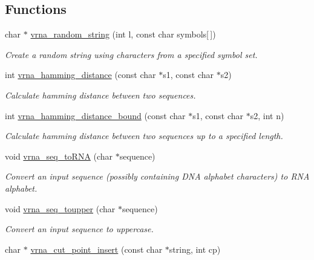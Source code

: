 \subsection*{Functions}
\begin{DoxyCompactItemize}
\item 
char $\ast$ \hyperlink{group__string__utils_ga4eeb3750dcf860b9f3158249f95dbd7f}{vrna\+\_\+random\+\_\+string} (int l, const char symbols\mbox{[}$\,$\mbox{]})
\begin{DoxyCompactList}\small\item\em Create a random string using characters from a specified symbol set. \end{DoxyCompactList}\item 
int \hyperlink{group__string__utils_ga301798b43b6f66687985c725efd14f32}{vrna\+\_\+hamming\+\_\+distance} (const char $\ast$s1, const char $\ast$s2)
\begin{DoxyCompactList}\small\item\em Calculate hamming distance between two sequences. \end{DoxyCompactList}\item 
int \hyperlink{group__string__utils_ga5d1c2271e79d9bcb52d4e68360763fb9}{vrna\+\_\+hamming\+\_\+distance\+\_\+bound} (const char $\ast$s1, const char $\ast$s2, int n)
\begin{DoxyCompactList}\small\item\em Calculate hamming distance between two sequences up to a specified length. \end{DoxyCompactList}\item 
void \hyperlink{group__string__utils_gacfed92cba77064f6c743f9118d079bfc}{vrna\+\_\+seq\+\_\+to\+R\+NA} (char $\ast$sequence)
\begin{DoxyCompactList}\small\item\em Convert an input sequence (possibly containing D\+NA alphabet characters) to R\+NA alphabet. \end{DoxyCompactList}\item 
void \hyperlink{group__string__utils_ga4f44dca03c9d708d68e64c0610bb9091}{vrna\+\_\+seq\+\_\+toupper} (char $\ast$sequence)
\begin{DoxyCompactList}\small\item\em Convert an input sequence to uppercase. \end{DoxyCompactList}\item 
char $\ast$ \hyperlink{group__string__utils_ga74f05ece32ea73b59f84a7452afd5fae}{vrna\+\_\+cut\+\_\+point\+\_\+insert} (const char $\ast$string, int cp)

\end{DoxyCompactItemize}
